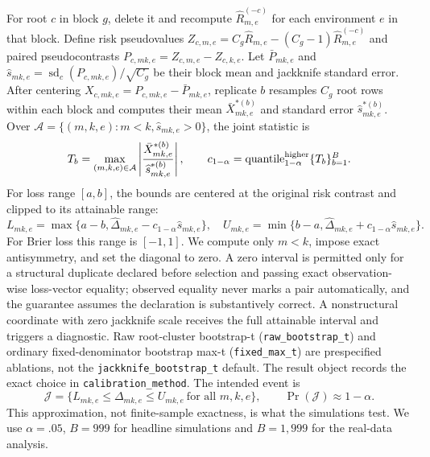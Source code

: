 \documentclass{article}
\begin{document}
For root $c$ in block $g$, delete it and recompute $\widehat R^{(-c)}_{m,e}$ for each environment $e$ in that block.  Define risk pseudovalues $Z_{c,m,e}=C_g\widehat R_{m,e}-(C_g-1)\widehat R^{(-c)}_{m,e}$ and paired pseudocontrasts $P_{c,mk,e}=Z_{c,m,e}-Z_{c,k,e}$.  Let $\bar P_{mk,e}$ and $\widehat s_{mk,e}=\operatorname{sd}_c(P_{c,mk,e})/\sqrt{C_g}$ be their block mean and jackknife standard error.  After centering $X_{c,mk,e}=P_{c,mk,e}-\bar P_{mk,e}$, replicate $b$ resamples $C_g$ root rows within each block and computes their mean $\bar X^{*(b)}_{mk,e}$ and standard error $\widehat s^{*(b)}_{mk,e}$.  Over $\mathcal A=\{(m,k,e):m<k,\widehat s_{mk,e}>0\}$, the joint statistic is
\begin{equation}
T_b=\max_{(m,k,e)\in\mathcal A}
\left|\frac{\bar X^{*(b)}_{mk,e}}{\widehat s^{*(b)}_{mk,e}}\right|,
\qquad c_{1-\alpha}=\operatorname{quantile}^{\rm higher}_{1-\alpha}\{T_b\}_{b=1}^B.
\label{eq:maxt}
\end{equation}
For loss range $[a,b]$, the bounds are centered at the original risk contrast and clipped to its attainable range:
\begin{equation}
L_{mk,e}=\max\{a-b,\widehat\Delta_{mk,e}-c_{1-\alpha}\widehat s_{mk,e}\},\quad
U_{mk,e}=\min\{b-a,\widehat\Delta_{mk,e}+c_{1-\alpha}\widehat s_{mk,e}\}.
\label{eq:bounds}
\end{equation}
For Brier loss this range is $[-1,1]$.  We compute only $m<k$, impose exact antisymmetry, and set the diagonal to zero.  A zero interval is permitted only for a structural duplicate declared before selection and passing exact observation-wise loss-vector equality; observed equality never marks a pair automatically, and the guarantee assumes the declaration is substantively correct.  A nonstructural coordinate with zero jackknife scale receives the full attainable interval and triggers a diagnostic.  Raw root-cluster bootstrap-t (\texttt{raw\_bootstrap\_t}) and ordinary fixed-denominator bootstrap max-t (\texttt{fixed\_max\_t}) are prespecified ablations, not the \texttt{jackknife\_bootstrap\_t} default.  The result object records the exact choice in \texttt{calibration\_method}.  The intended event is
\begin{equation}
\mathcal J=\{L_{mk,e}\leq\Delta_{mk,e}\leq U_{mk,e}
\ \text{for all }m,k,e\},\qquad \Pr(\mathcal J)\approx1-\alpha.
\label{eq:joint}
\end{equation}
This approximation, not finite-sample exactness, is what the simulations test.  We use $\alpha=.05$, $B=999$ for headline simulations and $B=1{,}999$ for the real-data analysis.
\end{document}
